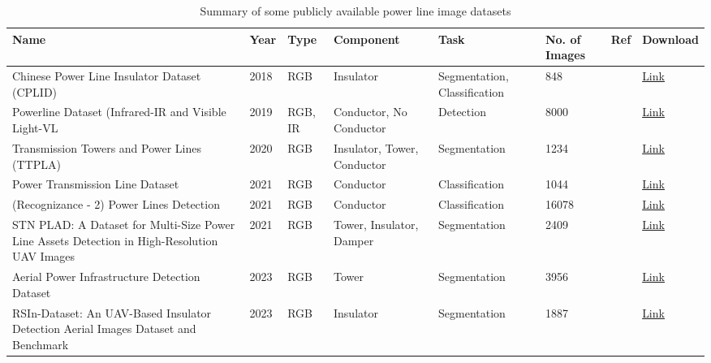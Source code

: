 \begin{table*}[htb]
\scriptsize
\caption{Summary of some publicly available power line image datasets}
\label{tab:datasets}
\begin{tabular}{P{0.3} P{0.05} P{0.05} P{0.1} P{0.125} P{0.075} P{0.05} P{0.05}}
\hline
Name & Year & Type & Component & Task & No. of Images & Ref & Download\\
\hline
Chinese Power Line Insulator Dataset (CPLID) & 2018 & RGB  & Insulator & Segmentation, Classification & 848 & \cite{tao2018detection} 
& \href{https://github.com/InsulatorData/InsulatorDataSet}{Link} \\

Powerline Dataset (Infrared-IR and Visible Light-VL & 2019 & RGB, IR  & Conductor, No Conductor & Detection & 8000 & \cite{Yetgin_2019} &  \href{https://data.mendeley.com/datasets/n6wrv4ry6v/8}{Link} \\

Transmission Towers and Power Lines (TTPLA) & 2020 & RGB & Insulator, Tower, Conductor & Segmentation & 1234 & \cite{abdelfattah2020ttpla} 
& \href{https://github.com/R3ab/ttpla_dataset}{Link} \\

Power Transmission Line Dataset & 2021 & RGB & Conductor & Classification & 1044 & \cite{t9qk_cn48_21} & \href{https://ieee-dataport.org/documents/power-transmission-line-dataset}{Link} \\

(Recognizance - 2) Power Lines Detection & 2021 & RGB & Conductor & Classification & 16078 & \cite{recognizance_2} 
& \href{https://www.kaggle.com/competitions/recognizance-2/overview}{Link} \\

STN PLAD: A Dataset for Multi-Size Power Line Assets Detection in High-Resolution UAV Images & 2021 & RGB  & Tower, Insulator, Damper & Segmentation & 2409 & \cite{9643100} 
& \href{https://ieeexplore.ieee.org/document/9643100}{Link} \\

Aerial Power Infrastructure Detection Dataset & 2023 & RGB  & Tower & Segmentation & 3956 & \cite{antonis_savva_2023_7781388} 
& \href{https://zenodo.org/records/7781388}{Link} \\

RSIn-Dataset: An UAV-Based Insulator Detection Aerial Images Dataset and Benchmark & 2023 & RGB  & Insulator & Segmentation & 1887 & \cite{drones7020125} 
& \href{https://github.com/caigouyihao/Rsin-dataset}{Link} \\
\hline
\end{tabular}
\end{table*}
